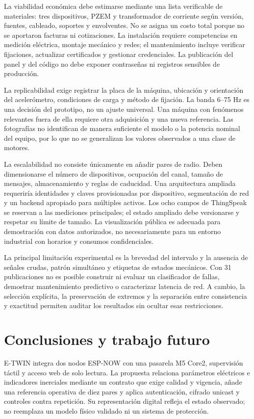 \documentclass[journal,onecolumn,11pt,a4paper]{IEEEtran}
\begin{document}
La viabilidad económica debe estimarse mediante una lista verificable de materiales: tres dispositivos, PZEM y transformador de corriente según versión, fuentes, cableado, soportes y envolventes. No se asigna un costo total porque no se aportaron facturas ni cotizaciones. La instalación requiere competencias en medición eléctrica, montaje mecánico y redes; el mantenimiento incluye verificar fijaciones, actualizar certificados y gestionar credenciales. La publicación del panel y del código no debe exponer contraseñas ni registros sensibles de producción.

La replicabilidad exige registrar la placa de la máquina, ubicación y orientación del acelerómetro, condiciones de carga y método de fijación. La banda 6--75 Hz es una decisión del prototipo, no un ajuste universal. Una máquina con fenómenos relevantes fuera de ella requiere otra adquisición y una nueva referencia. Las fotografías no identifican de manera suficiente el modelo o la potencia nominal del equipo, por lo que no se generalizan los valores observados a una clase de motores.

La escalabilidad no consiste únicamente en añadir pares de radio. Deben dimensionarse el número de dispositivos, ocupación del canal, tamaño de mensajes, almacenamiento y reglas de caducidad. Una arquitectura ampliada requeriría identidades y claves provisionadas por dispositivo, segmentación de red y un backend apropiado para múltiples activos. Los ocho campos de ThingSpeak se reservan a las mediciones principales; el estado ampliado debe versionarse y respetar su límite de tamaño. La visualización pública es adecuada para demostración con datos autorizados, no necesariamente para un entorno industrial con horarios y consumos confidenciales.

La principal limitación experimental es la brevedad del intervalo y la ausencia de señales crudas, patrón simultáneo y etiquetas de estados mecánicos. Con 31 publicaciones no es posible construir ni evaluar un clasificador de fallas, demostrar mantenimiento predictivo o caracterizar latencia de red. A cambio, la selección explícita, la preservación de extremos y la separación entre consistencia y exactitud permiten auditar los resultados sin ocultar esas restricciones.

\section{Conclusiones y trabajo futuro}
E-TWIN integra dos nodos ESP-NOW con una pasarela M5 Core2, supervisión táctil y acceso web de solo lectura. La propuesta relaciona parámetros eléctricos e indicadores inerciales mediante un contrato que exige calidad y vigencia, añade una referencia operativa de diez pares y aplica autenticación, cifrado unicast y controles contra repetición. Su representación digital refleja el estado observado; no reemplaza un modelo físico validado ni un sistema de protección.
\end{document}
